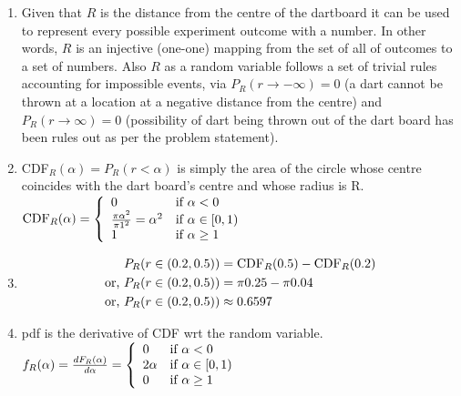 \begin{enumerate}[7a.]
	\item Given that $R$ is the distance from the centre of the dartboard it can be used to represent every possible experiment outcome with a number. In other words, $R$ is an injective (one-one) mapping from the set of all of outcomes to a set of numbers. Also $R$ as a random variable follows a set of trivial rules accounting for impossible events, via $P_R(r\rightarrow-\infty) = 0$ (a dart cannot be thrown at a location at a negative distance from the centre) and $P_R(r\rightarrow\infty) = 0$ (possibility of dart being thrown out of the dart board has been rules out as per the problem statement).
	
	\item CDF$_R(\alpha) = P_R(r<\alpha)$ is simply the area of the circle whose centre coincides with the dart board's centre and whose radius is R.\\[5pt]
	$\text{CDF}_R(\alpha) = \threepartdef{0}{\alpha < 0}{\frac{\pi \alpha^2}{\pi 1^2} = \alpha^2}{\alpha \in [0,1)}{1}{\alpha \geq 1}$
	
	\item 
		\begin{align}
			P_R(r \in (0.2, 0.5)) &= \text{CDF}_R(0.5) - \text{CDF}_R(0.2) \nonumber\\
			\text{or, } P_R(r \in (0.2, 0.5)) &= \pi0.25 - \pi0.04 \nonumber\\
			\text{or, } P_R(r \in (0.2, 0.5)) &\approx  0.6597 \nonumber
		\end{align}
	
	\item pdf is the derivative of CDF wrt the random variable.\\
	$f_R(\alpha) = \frac{dF_R(\alpha)}{d\alpha} = \threepartdef{0}{\alpha < 0}{2\alpha}{\alpha \in [0,1)}{0}{\alpha \geq 1}$
	

\end{enumerate}
